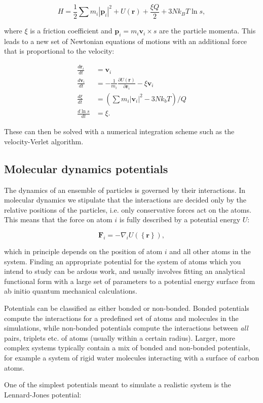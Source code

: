 $$ H = \frac{1}{2} \sum m_i \left| \bm{p}_i \right|^2 + U(\bm{r}) + \frac{\xi Q}{2}
    + 3Nk_B T \ln{s} , $$

where $\xi$ is a friction coefficient and $\bm{p}_i = m_i\bm{v}_i \times s$
are the particle momenta. This leads to a new set of Newtonian equations of motions
with an additional force that is proportional to the velocity:

\begin{equation}
\begin{split}
    \frac{d\bm{r}_i}{dt} &= \bm{v}_i \\
    \frac{d\bm{v}_i}{dt} &= - \frac{1}{m_i} \frac{\partial U(\bm{r})}{\partial \bm{r}_i}
    - \xi \bm{v}_i \\
    \frac{d\xi}{dt} &= \left( \sum m_i \left| \bm{v}_i \right|^2 - 3Nk_b T \right) / Q \\
    \frac{d \ln{s}}{dt} &= \xi .
\end{split}
\end{equation}

These can then be solved with a numerical integration scheme such as the
velocity-Verlet algorithm.

\subsection{Molecular dynamics potentials}
The dynamics of an ensemble of particles is governed by
their interactions. In molecular dynamics we stipulate that
the interactions are decided only by the relative positions
of the particles, i.e. only conservative forces act on the atoms.
This means that the force on atom $i$ is fully described
by a potential energy $U$:

$$ \bm{F}_i = -\nabla_i U \left(\left\{ \bm{r} \right\} \right) , $$

which in principle depends on the position of atom $i$
and all other atoms in the system. Finding an appropriate potential
for the system of atoms which you intend to study can be ardous work,
and usually involves fitting an analytical functional form
with a large set of parameters to a potential energy surface
from ab initio quantum mechanical calculations.
\par
Potentials can be classified as either bonded or non-bonded.
Bonded potentials compute the interactions for a predefined
set of atoms and molecules in the simulations, while
non-bonded potentials compute the interactions
between \textit{all} pairs, triplets etc. of atoms
(usually within a certain radius).
Larger, more complex systems typically contain a mix of
bonded and non-bonded potentials, for example a system of rigid water molecules
interacting with a surface of carbon atoms.
\par
One of the simplest potentials meant to simulate a realistic system
is the Lennard-Jones potential:


